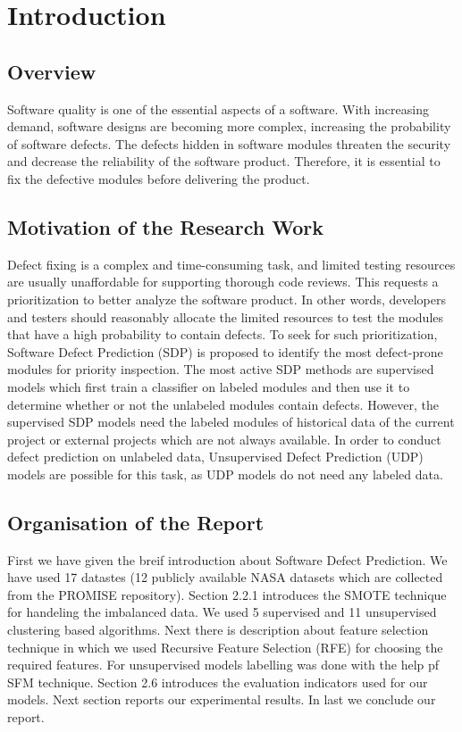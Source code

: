 \chapter{Introduction}\label{chap1}

\section{Overview}

Software quality is one of the essential aspects of a software. With increasing demand, software designs are becoming more complex, increasing the probability of software defects.
The defects hidden in software modules threaten the security
and decrease the reliability of the software product. Therefore, it is essential to fix the defective modules before delivering the product.

\section{Motivation of the Research Work}\label{sec1.1}

Defect fixing is a complex and time-consuming task, and limited testing resources are usually unaffordable for supporting thorough code reviews. This requests
a prioritization to better analyze the software product.
In other words, developers and testers should reasonably allocate the limited resources to test the modules that have a high probability to contain defects. To seek for such prioritization, Software Defect Prediction (SDP) is proposed to identify the most defect-prone modules for priority inspection. The most active SDP methods are supervised models which first train a classifier on labeled modules and then use it to determine whether or not the unlabeled modules contain defects. However, the supervised SDP models need the labeled modules of historical data of the current project or external projects which are not always available. In order to conduct defect prediction on unlabeled data, Unsupervised Defect Prediction (UDP) models are possible for this task, as UDP models do not need any labeled data.

\section{Organisation of the Report}\label{sec1.3}

First we have given the breif introduction about Software Defect Prediction. We have used 17 datastes (12 publicly available NASA datasets which are collected from the PROMISE repository). Section 2.2.1 introduces the SMOTE technique for handeling the imbalanced data. We used 5 supervised and 11 unsupervised clustering based algorithms. Next there is description about feature selection technique in which we used Recursive Feature Selection (RFE) for choosing the required features. For unsupervised models labelling was done with the help pf SFM technique. Section 2.6 introduces the evaluation indicators used for our models. Next section reports our experimental results. In last we conclude our report.